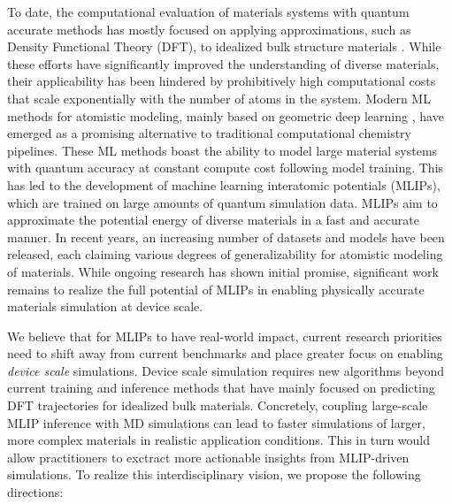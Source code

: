 To date, the computational evaluation of materials systems with quantum accurate methods has mostly focused on applying approximations, such as Density Functional Theory (DFT), to idealized bulk structure materials \citep{jain2011high, yang2019predicting, saal2013materials, horton2019high, doerr2016htmd, miret2023the}. While these efforts have significantly improved the understanding of diverse materials, their applicability has been hindered by prohibitively high computational costs that scale exponentially with the number of atoms in the system. Modern ML methods for atomistic modeling, mainly based on geometric deep learning \citep{duval2023hitchhiker}, have emerged as a promising alternative to traditional computational chemistry pipelines. These ML methods boast the ability to model large material systems with quantum accuracy at constant compute cost following model training. This has led to the development of machine learning interatomic potentials (MLIPs), which are trained on large amounts of quantum simulation data. MLIPs aim to approximate the potential energy of diverse materials in a fast and accurate manner. In recent years, an increasing number of datasets \citep{chanussot2021open, tran2023open, barroso2024open, lee2023matsciml, schmidt2024improving, wang2024perovs, fuemmeler2024advancing} and models \citep{batatia2023foundation, neumann2024orb, yang2024mattersim, chen2022universal, deng2023chgnet} have been released, each claiming various degrees of generalizability for atomistic modeling of materials. While ongoing research has shown initial promise, significant work remains to realize the full potential of MLIPs in enabling physically accurate materials simulation at device scale.
 

We believe that for MLIPs to have real-world impact, current research priorities need to shift away from current benchmarks \citep{lee2023matsciml, riebesell2023matbench, choudhary2020joint, chanussot2021open} and place greater focus on enabling \emph{device scale} simulations.
Device scale simulation requires new algorithms beyond current training and inference methods that have mainly focused on predicting DFT trajectories for idealized bulk materials. Concretely, coupling large-scale MLIP inference with MD simulations can lead to faster simulations of larger, more complex materials in realistic application conditions. This in turn would allow practitioners to exctract more actionable insights from MLIP-driven simulations. To realize this interdisciplinary vision, we propose the following directions: 

